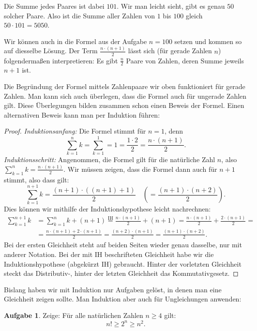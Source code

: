 \documentclass[a4paper,ngerman,12pt]{scrartcl}
\theoremstyle{definition}
\newtheorem*{aufg}{Aufgabe}
\begin{document}
Die Summe jedes Paares ist dabei $101$. Wir man leicht sieht, gibt es genau $50$ solcher Paare. Also ist die Summe aller Zahlen von $1$ bis $100$ gleich $50 \cdot 101 = 5050$.

Wir können auch in die Formel aus der Aufgabe $n = 100$ setzen und kommen so auf diesselbe Lösung. Der Term $\frac{n \cdot (n+1)}{2}$ lässt sich (für gerade Zahlen $n$) folgendermaßen interpretieren: Es gibt $\frac{n}{2}$ Paare von Zahlen, deren Summe jeweils $n+1$ ist.

Die Begründung der Formel mittels Zahlenpaare wir oben funktioniert für gerade Zahlen. Man kann sich auch überlegen, dass die Formel auch für ungerade Zahlen gilt. Diese Überlegungen bilden zusammen schon einen Beweis der Formel. Einen alternativen Beweis kann man per Induktion führen:

\begin{proof}
  \emph{Induktionsanfang:} Die Formel stimmt für $n=1$, denn
  \[ \sum\limits_{k=1}^n k = \sum\limits_{k=1}^1 = 1 = \frac{1 \cdot 2}{2} = \frac{n \cdot (n+1)}{2}. \]
  \emph{Induktionsschritt:} Angenommen, die Formel gilt für die natürliche Zahl $n$, also $\sum_{k=1}^n k = \frac{n \cdot (n+1)}{2}$. Wir müssen zeigen, dass die Formel dann auch für $n+1$ stimmt, also dass gilt:
  \[ \sum\limits_{k=1}^{n+1} k = \frac{(n+1) \cdot ((n+1)+1)}{2} \quad \left(= \frac{(n+1) \cdot (n+2)}{2} \right). \]
  Dies können wir mithilfe der Induktionshypothese leicht nachrechnen:
  \begin{align*}
    \sum\limits_{k=1}^{n+1} k &= \sum\limits_{k=1}^{n} k + (n+1) \overset{\text{IH}}{=} \frac{n \cdot (n+1)}{2} + (n+1) = \frac{n \cdot (n+1)}{2} + \frac{2 \cdot (n+1)}{2} =\\
    &= \frac{n \cdot (n+1) + 2 \cdot (n+1)}{2} = \frac{(n+2) \cdot (n+1)}{2} = \frac{(n+1) \cdot (n+2)}{2}.
  \end{align*}
  Bei der ersten Gleichheit steht auf beiden Seiten wieder genau dasselbe, nur mit anderer Notation. Bei der mit IH beschrifteten Gleichheit habe wir die Induktionshypothese (abgekürzt IH) gebraucht. Hinter der vorletzten Gleichheit steckt das Distributiv-, hinter der letzten Gleichheit das Kommutativgesetz.
\end{proof}

Bislang haben wir mit Induktion nur Aufgaben gelöst, in denen man eine Gleichheit zeigen sollte. Man Induktion aber auch für Ungleichungen anwenden:

\begin{aufg}
  Zeige: Für alle natürlichen Zahlen $n \geq 4$ gilt:
  \[ n! \geq 2^n \geq n^2. \]
\end{aufg}
\end{document}

